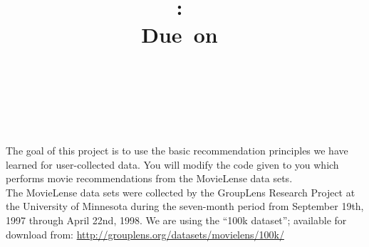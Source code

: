 \documentclass{article}
\title{
\vspace{2in}
\textmd{\textbf{\hmwkClass:\ \hmwkTitle}}\\
\normalsize\vspace{0.1in}\small{Due\ on\ \hmwkDueDate}\\
\vspace{0.1in}\large{\textit{\hmwkClassInstructor\ }}
\vspace{3in}
}
\author{\textbf{\hmwkAuthorName} \\ \hmwkAuthorEmail}
\date{} %
\newcounter{sub}[section]
\begin{document}
\clearpage\maketitle
\thispagestyle{empty}



\newpage
\clearpage\tableofcontents
\listoffigures
\lstlistoflistings
\listoftables

\thispagestyle{empty}
\newpage
\setcounter{page}{1}

The goal of this project is to use the basic recommendation principles we have learned for user-collected data. You will modify the code given to you which performs movie recommendations from the MovieLense data sets.\\

The MovieLense data sets were collected by the GroupLens Research Project at the University of Minnesota during the seven-month period from September 19th, 1997 through April 22nd, 1998.  We are using the  \enquote{100k dataset}; available for download from: \url{http://grouplens.org/datasets/movielens/100k/}\\
\end{document}
